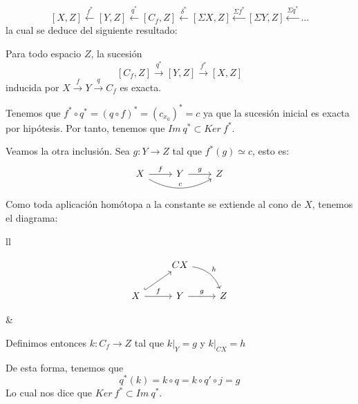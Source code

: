 \[ [X, Z] \stackrel{f^*}{\longleftarrow} [Y, Z] \stackrel{q^*}{\longleftarrow} [C_f, Z] \stackrel{\delta^*}{\longleftarrow} [\Sigma X, Z] \stackrel{\Sigma f^*}{\longleftarrow} [\Sigma Y, Z] \stackrel{\Sigma q^*}{\longleftarrow} \dots \]
la cual se deduce del siguiente resultado:
\begin{teor}
Para todo espacio $Z$, la sucesión 
\[ [C_f, Z] \stackrel{q^*}{\longrightarrow} [Y, Z] \stackrel{f^*}{\longrightarrow} [X, Z] \]
inducida por $X \stackrel{f}{\longrightarrow} Y \stackrel{q}{\longrightarrow} C_f$ es exacta.
\end{teor}
\begin{demo}
Tenemos que $ f^* \circ q^* = (q \circ f)^* = (c_{x_0})^* = c$ ya que la sucesión inicial es exacta por hipótesis. Por tanto, tenemos que $Im \ q^* \subset Ker \ f^* $.\par 
Veamos la otra inclusión. Sea $g : Y \longrightarrow Z$ tal que $f^*(g) \simeq c$, esto es:
\[
\begin{tikzcd}
X \rar{f} \arrow[bend right]{rr}{c} & Y \rar{g} & Z
\end{tikzcd}
\]
Como toda aplicación homótopa a la constante se extiende al cono de $X$, tenemos el diagrama: \par
\begin{tabular}{ll}
\begin{minipage}{0.4\textwidth}
\[
\begin{tikzcd}
{} & CX \arrow[bend left]{rd}{h} &  \\
X \rar{f} \arrow[hook]{ur}  & Y \rar{g}  & Z
\end{tikzcd}
\]
\end{minipage}
&
\begin{minipage}{0.55\textwidth}
Definimos entonces $k : C_f \longrightarrow Z$ tal que $k\vert_Y = g$ y $k \vert_{CX} = h$ \par
De esta forma, tenemos que 
\[
q^*(k) = k \circ q = k \circ q' \circ j = g
\]
Lo cual nos dice que $Ker \ f^* \subset Im \ q^*$.
\end{minipage}
\end{tabular}
\end{demo}

